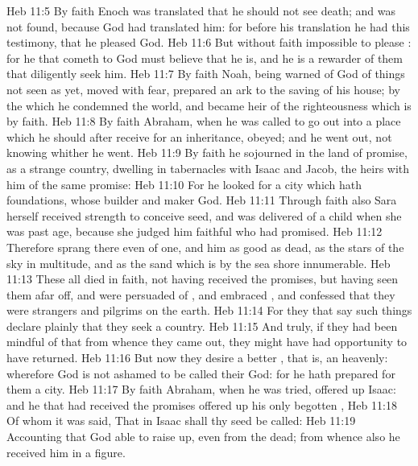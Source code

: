 \vs Heb 11:5 By faith Enoch was translated that he should not see death; and was not found, because God had translated him: for before his translation he had this testimony, that he pleased God.
\vs Heb 11:6 But without faith  impossible to please : for he that cometh to God must believe that he is, and  he is a rewarder of them that diligently seek him.
\vs Heb 11:7 By faith Noah, being warned of God of things not seen as yet, moved with fear, prepared an ark to the saving of his house; by the which he condemned the world, and became heir of the righteousness which is by faith.
\vs Heb 11:8 By faith Abraham, when he was called to go out into a place which he should after receive for an inheritance, obeyed; and he went out, not knowing whither he went.
\vs Heb 11:9 By faith he sojourned in the land of promise, as  a strange country, dwelling in tabernacles with Isaac and Jacob, the heirs with him of the same promise:
\vs Heb 11:10 For he looked for a city which hath foundations, whose builder and maker  God.
\vs Heb 11:11 Through faith also Sara herself received strength to conceive seed, and was delivered of a child when she was past age, because she judged him faithful who had promised.
\vs Heb 11:12 Therefore sprang there even of one, and him as good as dead,  as the stars of the sky in multitude, and as the sand which is by the sea shore innumerable.
\vs Heb 11:13 These all died in faith, not having received the promises, but having seen them afar off, and were persuaded of , and embraced , and confessed that they were strangers and pilgrims on the earth.
\vs Heb 11:14 For they that say such things declare plainly that they seek a country.
\vs Heb 11:15 And truly, if they had been mindful of that  from whence they came out, they might have had opportunity to have returned.
\vs Heb 11:16 But now they desire a better , that is, an heavenly: wherefore God is not ashamed to be called their God: for he hath prepared for them a city.
\vs Heb 11:17 By faith Abraham, when he was tried, offered up Isaac: and he that had received the promises offered up his only begotten ,
\vs Heb 11:18 Of whom it was said, That in Isaac shall thy seed be called:
\vs Heb 11:19 Accounting that God  able to raise  up, even from the dead; from whence also he received him in a figure.
